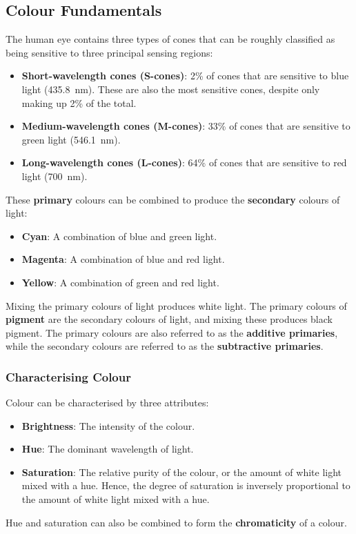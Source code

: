 \documentclass{article}
\begin{document}
\subsection{Colour Fundamentals}
The human eye contains three types of cones that can be roughly
classified as being sensitive to three principal sensing regions:
\begin{itemize}
    \item \textbf{Short-wavelength cones (S-cones)}: 2\% of cones that are sensitive to blue light (\qty{435.8}{nm}). These are also the most sensitive cones, despite only making up 2\% of the total.
    \item \textbf{Medium-wavelength cones (M-cones)}: 33\% of cones that are sensitive to green light (\qty{546.1}{nm}).
    \item \textbf{Long-wavelength cones (L-cones)}: 64\% of cones that are sensitive to red light (\qty{700}{nm}).
\end{itemize}
These \textbf{primary} colours can be combined to produce the
\textbf{secondary} colours of light:
\begin{itemize}
    \item \textbf{Cyan}: A combination of blue and green light.
    \item \textbf{Magenta}: A combination of blue and red light.
    \item \textbf{Yellow}: A combination of green and red light.
\end{itemize}
Mixing the primary colours of light produces white light. The primary
colours of \textbf{pigment} are the secondary colours of light, and
mixing these produces black pigment. The primary colours are also
referred to as the \textbf{additive primaries}, while the secondary
colours are referred to as the \textbf{subtractive primaries}.
\subsubsection{Characterising Colour}
Colour can be characterised by three attributes:
\begin{itemize}
    \item \textbf{Brightness}: The intensity of the colour.
    \item \textbf{Hue}: The dominant wavelength of light.
    \item \textbf{Saturation}: The relative purity of the colour, or the amount of white light mixed with a hue.
          Hence, the degree of saturation is inversely proportional to the amount of white light mixed with a hue.
\end{itemize}
Hue and saturation can also be combined to form the \textbf{chromaticity}
of a colour.
\end{document}
